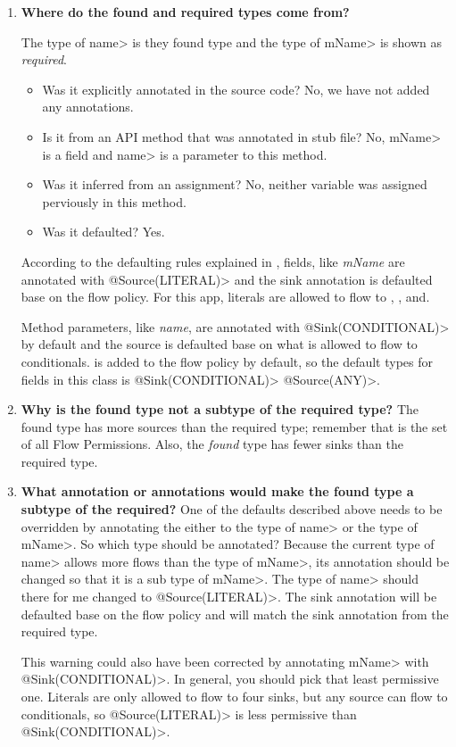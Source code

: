 \begin{enumerate}

\item \textbf{Where do the found  and required types come from?}

The type of \<name> is they found type and the type of \<mName> is
shown as \emph{required}.  

 \begin{itemize}
    \item Was it explicitly annotated in the source code? No, we have not added 
    any annotations.
    \item Is it from an API method that was annotated in stub file? No, \<mName> 
    is a field and \<name> is a parameter to this method.
    \item Was it inferred from an assignment? No, neither variable was assigned 
    perviously in this method. 
    \item Was it defaulted? Yes.
    \end{itemize}

 According to the defaulting rules explained in , fields, like \emph{mName} 
 are annotated with \<@Source(LITERAL)> and the sink annotation is defaulted base on the  
 flow policy.  For this app, literals are allowed to flow to , 
 , and. 
 
 Method parameters, like \emph{name}, are annotated with \<@Sink(CONDITIONAL)> by 
 default and the source is defaulted base on what is allowed to flow to conditionals.
    is added to the flow policy by default, so the default types
    for fields in this class is \<@Sink(CONDITIONAL)> \<@Source(ANY)>.

 
 \item\textbf{ Why is the found type not a subtype of the required type?}
The found type has more sources than the required type; remember that 
is the set of all Flow Permissions. Also, the \emph{found} type has fewer sinks 
than the required type.

\item\textbf{What annotation or annotations would make the found type a subtype of the required?}
One of the defaults described above needs to be overridden by annotating the 
 either to the type of \<name> or the type of \<mName>. So which type should be 
 annotated? Because the current type of \<name> allows more flows than the type
 of \<mName>, its annotation should be changed so that it is a sub type of \<mName>.
  The type of \<name> should there for me changed to \<@Source(LITERAL)>. The 
  sink annotation will be defaulted base on the flow policy and will match the 
  sink annotation from the required type.


 This warning could also have been corrected by annotating \<mName> with \<@Sink(CONDITIONAL)>.
   In general, you should pick that least permissive one.  Literals are only 
   allowed to flow to four sinks, but any source can flow to conditionals, so
 \<@Source(LITERAL)> is less permissive than \<@Sink(CONDITIONAL)>.
 \end{enumerate}
